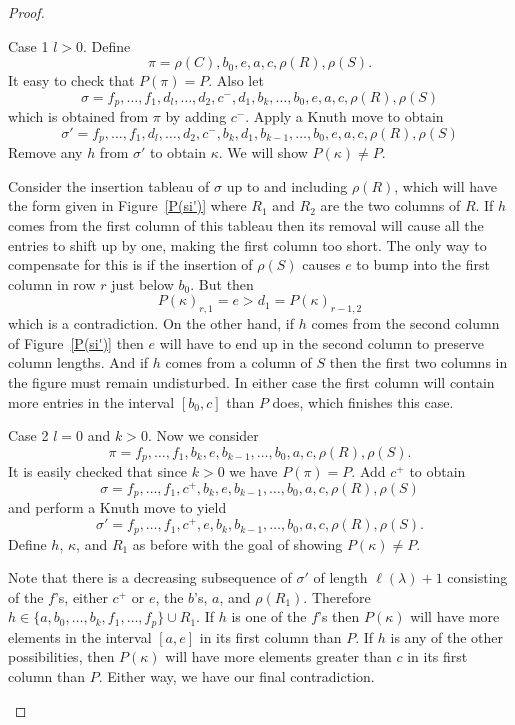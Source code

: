 \documentclass[ALCO,ThmDefs,Unicode,epreuves]{cedram}
\newcommand{\ka}{\kappa}
\newcommand{\la}{\lambda}
\newcommand{\si}{\sigma}
\begin{document}
\begin{proof}
\begin{enonce*}[remark]{Case 1} $l > 0$.
Define
\[
\pi = \rho(C), b_0, e, a, c, \rho(R), \rho(S).
\]
It easy to check that $P(\pi) = P$.
Also let
\[
\si= f_p,\dots,f_1,d_l,\dots,d_2,c^-,d_1,b_k,\dots,b_0, e, a, c, \rho(R), \rho(S)
\]
which is obtained from $\pi$ by adding $c^-$. Apply a Knuth move to obtain
\[
\si'= f_p,\dots,f_1,d_l,\dots,d_2,c^-,b_k,d_1,b_{k-1},\dots,b_0, e, a, c, \rho(R), \rho(S)
\]
Remove any $h$ from $\si'$ to obtain $\ka$. We will show $P(\ka)\neq P$.

Consider the insertion tableau of $\si$ up to and including $\rho(R)$, which will have the form given in Figure~\ref{P(si')} where $R_1$ and $R_2$ are the two columns of $R$. If $h$ comes from the first column of this tableau then its removal will cause all the entries to shift up by one, making the first column too short. The only way to compensate for this is if the insertion of $\rho(S)$ causes $e$ to bump into the first column in row $r$ just below $b_0$. But then 
\[
P(\ka)_{r,1}=e>d_1=P(\ka)_{r-1,2}
\]
which is a contradiction. On the other hand, if $h$ comes from the second column of Figure~\ref{P(si')} then $e$ will have to end up in the second column to preserve column lengths. And if $h$ comes from a column of $S$ then the first two columns in the figure must remain undisturbed. In either case the first column will contain more entries in the interval $[b_0,c]$ than $P$ does, which finishes this case.
\end{enonce*}

\begin{enonce*}[remark]{Case 2} 
$l=0$ and $k>0$.
Now we consider
\[
\pi= f_p,\dots,f_1,b_k,e,b_{k-1},\dots,b_0, a, c, \rho(R), \rho(S).
\]
It is easily checked that since $k>0$ we have $P(\pi)=P$. Add $c^+$ to obtain
\[
\si= f_p,\dots,f_1,c^+,b_k,e,b_{k-1},\dots,b_0, a, c, \rho(R), \rho(S)
\]
and perform a Knuth move to yield
\[
\si'=f_p,\dots,f_1,c^+,e,b_k,b_{k-1},\dots,b_0, a, c, \rho(R), \rho(S).
\]
Define $h$, $\ka$, and $R_1$ as before with the goal of showing $P(\ka)\neq P$.



Note that there is a decreasing subsequence of $\si'$ of length $\ell(\la)+1$ consisting of the $f$'s, either $c^+$ or $e$, the $b$'s, $a$, and $\rho(R_1)$.
Therefore $h\in\{a,b_0,\dots,b_k,f_1,\dots,f_p\}\cup R_1$. If $h$ is one of the $f$'s then $P(\ka)$ will have more elements in the interval $[a,e]$ in its first column than $P$. If $h$ is any of the other possibilities, then $P(\ka)$ will have more elements greater than $c$ in its first column than $P$. Either way, we have our final contradiction.\qedhere
\end{enonce*}
\end{proof}
\end{document}
